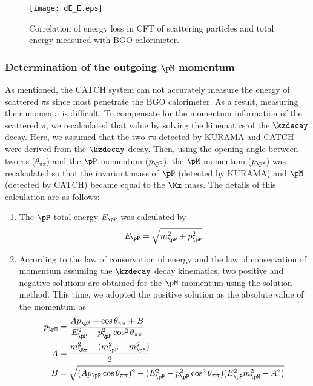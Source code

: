 \begin{figure}[!h]
  \begin{center}
    \texttt{[image: dE\_E.eps]}
    \caption{Correlation of energy loss in CFT of scattering particles and total energy measured with BGO calorimeter.}
    \label{fig-dE_E}
  \end{center}
\end{figure}

\subsubsection{Determination of the outgoing $\pM$ momentum}
As mentioned, the CATCH system can not accurately measure the energy of scattered $\pi$s since most penetrate the BGO calorimeter. As a result, measuring their momenta is difficult. To compensate for the momentum information of the scattered $\pi$, we recalculated that value by solving the kinematics of the $\kzdecay$ decay. Here, we assumed that the two $\pi$s detected by KURAMA and CATCH were derived from the $\kzdecay$ decay. Then, using the opening angle between two $\pi$s ($\theta_{\pi\pi}$) and the $\pP$ momentum ($p_{\pP}$), the $\pM$ momentum ($p_{\pM}$) was recalculated so that the invariant mass of $\pP$ (detected by KURAMA) and $\pM$ (detected by CATCH) became equal to the $\Kz$ mass. The details of this calculation are as follows:

\begin{enumerate}
  \item The $\pP$ total energy $E_{\pP}$ was calculated by 
\begin{equation}
  E_{\pP} = \sqrt{m_{\pP}^{2} + p_{\pP}^{2}}.
\end{equation}

  \item According to the law of conservation of energy and the law of conservation of momentum assuming the $\kzdecay$ decay kinematics, two positive and negative solutions are obtained for the $\pM$ momentum using the solution method. This time, we adopted the positive solution as the absolute value of the momentum as 
\begin{align}
  p_{\pM} &= \frac{Ap_{\pP} + \cos{\theta_{\pi\pi}} + B}{E_{\pP}^{2} - p_{\pP}^{2} \cos^{2}{\theta_{\pi\pi}}} \\
  A &= \frac{m_{\Kz}^{2} - (m_{\pP}^{2} + m_{\pM}^{2})}{2} \\
  B &= \sqrt{(Ap_{\pP}\cos{\theta_{\pi\pi}})^{2} - (E_{\pP}^{2} - p_{\pP}^{2} \cos^{2}{\theta_{\pi\pi}}) (E_{\pP}^{2}m_{\pM}^{2} - A^{2})}
\end{align}

\end{enumerate}

